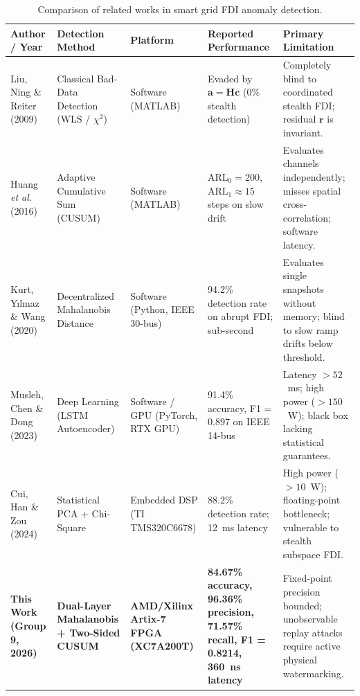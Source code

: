 \documentclass[11pt,a4paper]{report}
\begin{document}
\begin{table}[H]
\centering
\caption{Comparison of related works in smart grid FDI anomaly detection.}
\label{tab:priorwork}
\small
\renewcommand{\arraystretch}{1.25}
\begin{tabular}{|p{2.6cm}|p{2.4cm}|p{2.2cm}|p{3.2cm}|p{3.6cm}|}
\hline
\textbf{Author / Year} & \textbf{Detection Method} & \textbf{Platform} & \textbf{Reported Performance} & \textbf{Primary Limitation} \\
\hline
Liu, Ning \& Reiter (2009) \cite{liu2009} & Classical Bad-Data Detection (WLS / $\chi^2$) & Software (MATLAB) & Evaded by $\boldsymbol{a}=\boldsymbol{H}\boldsymbol{c}$ (0\% stealth detection) & Completely blind to coordinated stealth FDI; residual $\boldsymbol{r}$ is invariant. \\
\hline
Huang \textit{et al.} (2016) \cite{huang2016} & Adaptive Cumulative Sum (CUSUM) & Software (MATLAB) & $\text{ARL}_0 = 200$, $\text{ARL}_1 \approx 15$ steps on slow drift & Evaluates channels independently; misses spatial cross-correlation; software latency. \\
\hline
Kurt, Y\i lmaz \& Wang (2020) \cite{kurt2020} & Decentralized Mahalanobis Distance & Software (Python, IEEE 30-bus) & 94.2\% detection rate on abrupt FDI; sub-second & Evaluates single snapshots without memory; blind to slow ramp drifts below threshold. \\
\hline
Musleh, Chen \& Dong (2023) \cite{musleh2023} & Deep Learning (LSTM Autoencoder) & Software / GPU (PyTorch, RTX GPU) & 91.4\% accuracy, F1 = 0.897 on IEEE 14-bus & Latency $> 52$~ms; high power ($> 150$~W); black box lacking statistical guarantees. \\
\hline
Cui, Han \& Zou (2024) \cite{cui2024} & Statistical PCA + Chi-Square & Embedded DSP (TI TMS320C6678) & 88.2\% detection rate; 12~ms latency & High power ($> 10$~W); floating-point bottleneck; vulnerable to stealth subspace FDI. \\
\hline
\textbf{This Work (Group 9, 2026)} & \textbf{Dual-Layer Mahalanobis + Two-Sided CUSUM} & \textbf{AMD/Xilinx Artix-7 FPGA (XC7A200T)} & \textbf{84.67\% accuracy, 96.36\% precision, 71.57\% recall, F1 = 0.8214, 360~ns latency} & Fixed-point precision bounded; unobservable replay attacks require active physical watermarking. \\
\hline
\end{tabular}
\end{table}
\end{document}
